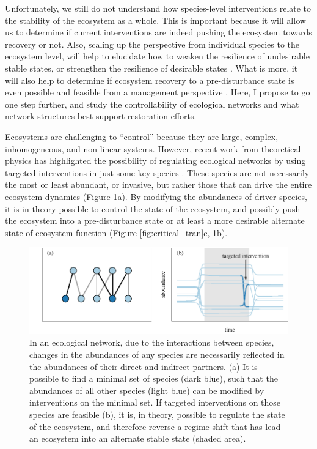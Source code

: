 \documentclass[a4paper]{article}
\begin{document}
Unfortunately, we still do not understand how species-level interventions relate to the stability of the ecosystem as a whole.
This is important because it will allow us to determine if current interventions are indeed pushing the ecosystem towards recovery or not.
Also, scaling up the perspective from individual species to the ecosystem level, will help to elucidate how to weaken the resilience of undesirable stable states, or strengthen the resilience of desirable states \autocite{Graham2013a}.
What is more, it will also help to determine if ecosystem recovery to a pre-disturbance state is even possible and feasible from a management perspective \autocite{Suding2009}.
Here, I propose to go one step further, and study the controllability of ecological networks and what network structures best support restoration efforts.

Ecosystems are challenging to ``control'' because they are large, complex, inhomogeneous, and non-linear systems.
However, recent work from theoretical physics has highlighted the possibility of regulating ecological networks by using targeted interventions in just some key species \autocite{Isbell2013, Cornelius2013}.
These species are not necessarily the most or least abundant, or invasive, but rather those that can drive the entire ecosystem dynamics \autocite{Liu2011} (\hyperref[fig:control_net]{Figure \ref{fig:control_net}a}).
By modifying the abundances of driver species, it is in theory possible to control the state of the ecosystem, and possibly push the ecosystem into a pre-disturbance state or at least a more desirable alternate state of ecosystem function (\hyperref[fig:critical_tran]{Figure \ref{fig:critical_tran}c}, \hyperref[fig:control_net]{\ref{fig:control_net}b}).

\begin{figure}
  \centering
  \includegraphics{control_net_prop}
  \caption{
  \label{fig:control_net}
  In an ecological network, due to the interactions between species, changes in the abundances of any species are necessarily reflected in the abundances of their direct and indirect partners.
  (a) It is possible to find a minimal set of species (dark blue), such that the abundances of all other species (light blue) can be modified by interventions on the minimal set.
  If targeted interventions on those species are feasible (b), it is, in theory, possible to regulate the state of the ecosystem, and therefore reverse a regime shift that has lead an ecosystem into an alternate stable state (shaded area).
  }
\end{figure}
\end{document}
